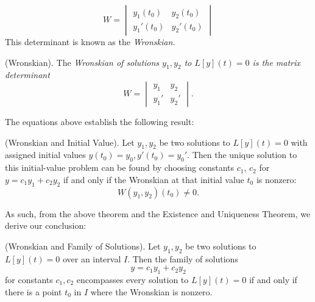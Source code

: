 \documentclass{article}
\begin{document}
\begin{equation*}
    W = \begin{vmatrix}
        y_1(t_0) & y_2(t_0) \\
        y_1'(t_0) & y_2'(t_0)
    \end{vmatrix}
\end{equation*}
This determinant is known as the \it Wronskian.
\begin{definition}
    (Wronskian). The \it Wronskian \normalfont of solutions $y_1, y_2$ to $L[y](t) = 0$ is the matrix determinant
    \begin{equation*}
        W = \begin{vmatrix}
            y_1 & y_2 \\
            y_1' & y_2'
        \end{vmatrix}.
    \end{equation*}
\end{definition}
The equations above establish the following result:
\begin{theorem}
    (Wronskian and Initial Value). Let $y_1, y_2$ be two solutions to $L[y](t)=0$ with assigned initial values $y(t_0)=y_0, y'(t_0)=y_0'$. Then the unique solution to this initial-value problem can be found by choosing constants $c_1$, $c_2$ for $y=c_1 y_1 + c_2 y_2$ if and only if the Wronskian at that initial value $t_0$ is nonzero: 
    \begin{equation*}
        W(y_1,y_2)(t_0) \neq 0.
    \end{equation*}
\end{theorem}
\normalfont As such, from the above theorem and the Existence and Uniqueness Theorem, we derive our conclusion:
\begin{theorem}
    (Wronskian and Family of Solutions). Let $y_1, y_2$ be two solutions to $L[y](t)=0$ over an interval $I$. Then the family of solutions
    \begin{equation*}
        y = c_1y_1 + c_2y_2
    \end{equation*}
    for constants $c_1, c_2$ encompasses every solution to $L[y](t) = 0$ if and only if there is a point $t_0$ in $I$ where the Wronskian is nonzero.
\end{theorem}
\end{document}
